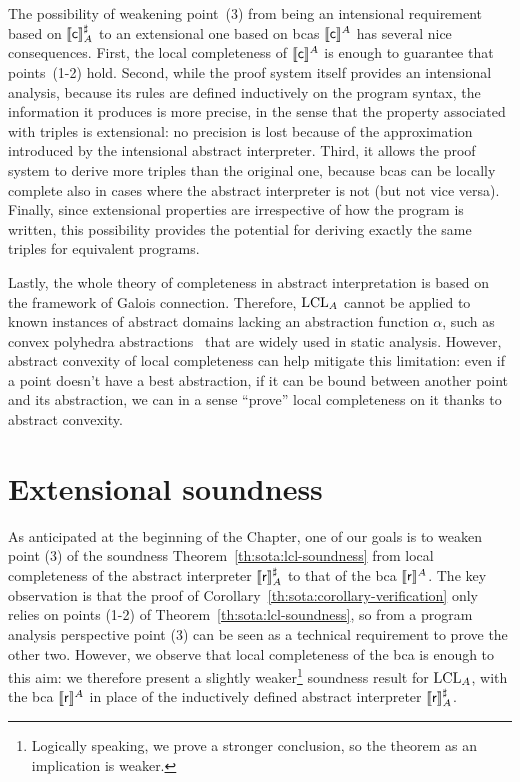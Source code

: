 The possibility of weakening point~(3) from being an intensional requirement based on $\llbracket\mathsf{c}\rrbracket^{\sharp}_A$ to an extensional one based on bcas $\llbracket\mathsf{c}\rrbracket^A$ has several nice consequences.
First, the local completeness of $\llbracket\mathsf{c}\rrbracket^A$ is enough to guarantee that points~(1-2) hold.
Second, while the proof system itself provides an intensional analysis, because its rules are defined inductively on the program syntax, the information it produces is more precise, in the sense that the property associated with triples is extensional: no precision is lost because of the approximation introduced by the intensional abstract interpreter.
Third, it allows the proof system to derive more triples than the original one, because bcas can be locally complete also in cases where the abstract interpreter is not (but not vice versa).
Finally, since extensional properties are irrespective of how the program is written, this possibility provides the potential for deriving exactly the same triples for equivalent programs.

Lastly, the whole theory of completeness in abstract interpretation is based on the framework of Galois connection. Therefore, $\text{LCL}_A$ cannot be applied to known instances of abstract domains lacking an abstraction function $\alpha$, such as convex polyhedra abstractions~\cite{CH78} that are widely used in static analysis. However, abstract convexity of local completeness can help mitigate this limitation: even if a point doesn't have a best abstraction, if it can be bound between another point and its abstraction, we can in a sense ``prove'' local completeness on it thanks to abstract convexity.

\section{Extensional soundness}
As anticipated at the beginning of the Chapter, one of our goals is to weaken point (3) of the soundness Theorem~\ref{th:sota:lcl-soundness} from local completeness of the abstract interpreter $\llbracket\mathsf{r}\rrbracket^{\sharp}_A$ to that of the bca $\llbracket\mathsf{r}\rrbracket^A$. The key observation is that the proof of Corollary~\ref{th:sota:corollary-verification} only relies on points (1-2) of Theorem~\ref{th:sota:lcl-soundness}, so from a program analysis perspective point (3) can be seen as a technical requirement to prove the other two. However, we observe that local completeness of the bca is enough to this aim: we therefore present a slightly weaker\footnote{Logically speaking, we prove a stronger conclusion, so the theorem as an implication is weaker.} soundness result for $\text{LCL}_A$, with the bca $\llbracket\mathsf{r}\rrbracket^A$ in place of the inductively defined abstract interpreter $\llbracket\mathsf{r}\rrbracket^{\sharp}_A$.

